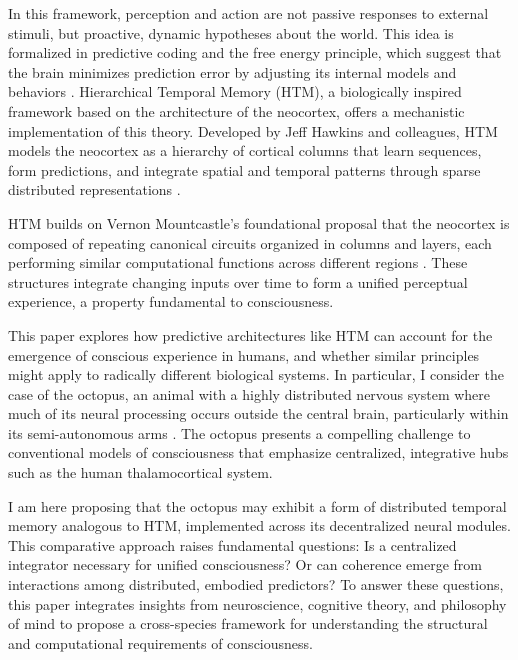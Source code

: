 \documentclass{article}
\begin{document}
In this framework, perception and action are not passive responses to external stimuli, but proactive, dynamic hypotheses about the world. This idea is formalized in predictive coding and the free energy principle, which suggest that the brain minimizes prediction error by adjusting its internal models and behaviors \parencite{friston2010free}. Hierarchical Temporal Memory (HTM), a biologically inspired framework based on the architecture of the neocortex, offers a mechanistic implementation of this theory. Developed by Jeff Hawkins and colleagues, HTM models the neocortex as a hierarchy of cortical columns that learn sequences, form predictions, and integrate spatial and temporal patterns through sparse distributed representations \parencite{hawkins2017theory, hawkins2016why, ahmad2015properties}.

HTM builds on Vernon Mountcastle’s foundational proposal that the neocortex is composed of repeating canonical circuits organized in columns and layers, each performing similar computational functions across different regions \parencite{mountcastle1997columnar}. These structures integrate changing inputs over time to form a unified perceptual experience, a property fundamental to consciousness.

This paper explores how predictive architectures like HTM can account for the emergence of conscious experience in humans, and whether similar principles might apply to radically different biological systems. In particular, I consider the case of the octopus, an animal with a highly distributed nervous system where much of its neural processing occurs outside the central brain, particularly within its semi-autonomous arms \parencite{carls2022where, mather2021octopus, huffard2013cephalopod}. The octopus presents a compelling challenge to conventional models of consciousness that emphasize centralized, integrative hubs such as the human thalamocortical system.

I am here proposing that the octopus may exhibit a form of distributed temporal memory analogous to HTM, implemented across its decentralized neural modules. This comparative approach raises fundamental questions: Is a centralized integrator necessary for unified consciousness? Or can coherence emerge from interactions among distributed, embodied predictors? To answer these questions, this paper integrates insights from neuroscience, cognitive theory, and philosophy of mind to propose a cross-species framework for understanding the structural and computational requirements of consciousness.
\end{document}
